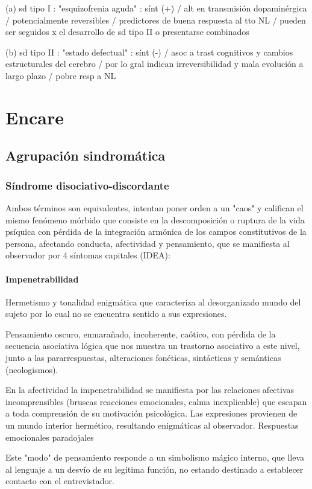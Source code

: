 (a) sd tipo I : "esquizofrenia aguda" : sínt (+) / alt en transmisión dopaminérgica / potencialmente reversibles / predictores de buena respuesta al tto NL / pueden ser seguidos x el desarrollo de sd tipo II o presentarse combinados 

(b) sd tipo II : "estado defectual" : sínt (-) / asoc a trast cognitivos y cambios estructurales del cerebro / por lo gral indican irreversibilidad y mala evolución a largo plazo / pobre resp a NL
\section*{Encare}
\subsection*{Agrupación sindromática}
\subsubsection*{Síndrome disociativo-discordante}
Ambos términos son equivalentes, intentan poner orden a un "caos" y califican el mismo fenómeno mórbido que consiste en la descomposición o ruptura de la vida psíquica con pérdida de la integración armónica de los campos constitutivos de la persona, afectando conducta, afectividad y pensamiento, que se manifiesta al observador por 4 síntomas capitales (IDEA):

\paragraph*{Impenetrabilidad}
Hermetismo y tonalidad enigmática que caracteriza al desorganizado mundo del sujeto por lo cual no se encuentra sentido a sus expresiones.

Pensamiento oscuro, enmarañado, incoherente, caótico, con pérdida de la secuencia asociativa lógica que nos muestra un trastorno asociativo a este nivel, junto a las pararrespuestas, alteraciones fonéticas, sintácticas y semánticas (neologismos).

En la afectividad la impenetrabilidad se manifiesta por las relaciones afectivas incomprensibles (bruscas reacciones emocionales, calma inexplicable) que escapan a toda comprensión de su motivación psicológica. Las expresiones provienen de un mundo interior hermético, resultando enigmáticas al observador. Respuestas emocionales paradojales

Este "modo" de pensamiento responde a un simbolismo mágico interno, que lleva al lenguaje a un desvío de su legítima función, no estando destinado a establecer contacto con el entrevistador.

